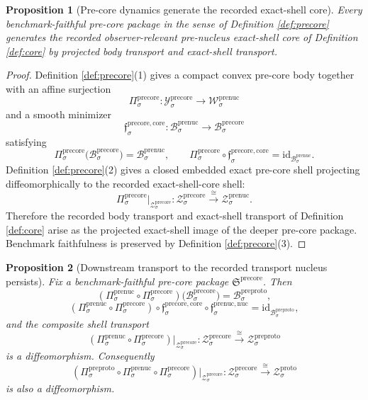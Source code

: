 \documentclass[11pt]{article}
\newcommand{\ProtoShellSet}[1]{\mathcal Z_{#1}^{\mathrm{proto}}}
\newcommand{\PreProtoBody}[1]{\mathcal B_{#1}^{\mathrm{preproto}}}
\newcommand{\PreProtoProj}[1]{\Pi_{#1}^{\mathrm{preproto}}}
\newcommand{\PreProtoShellSet}[1]{\mathcal Z_{#1}^{\mathrm{preproto}}}
\newcommand{\PreNucSpace}[1]{\mathcal W_{#1}^{\mathrm{prenuc}}}
\newcommand{\PreNucBody}[1]{\mathcal B_{#1}^{\mathrm{prenuc}}}
\newcommand{\PreNucProj}[1]{\Pi_{#1}^{\mathrm{prenuc}}}
\newcommand{\PreNucNucleusMin}[1]{\mathfrak f_{#1}^{\mathrm{prenuc,nuc}}}
\newcommand{\PreNucShellSet}[1]{\mathcal Z_{#1}^{\mathrm{prenuc}}}
\newcommand{\PreCorePackage}{\mathfrak S^{\mathrm{precore}}}
\newcommand{\PreCoreSpace}[1]{\mathcal Y_{#1}^{\mathrm{precore}}}
\newcommand{\PreCoreBody}[1]{\mathcal B_{#1}^{\mathrm{precore}}}
\newcommand{\PreCoreProj}[1]{\Pi_{#1}^{\mathrm{precore}}}
\newcommand{\PreCoreCoreMin}[1]{\mathfrak f_{#1}^{\mathrm{precore,core}}}
\newcommand{\PreCoreShellSet}[1]{\mathcal Z_{#1}^{\mathrm{precore}}}
\newtheorem{proposition}{Proposition}
\begin{document}
\begin{proposition}[Pre-core dynamics generate the recorded exact-shell core]
\label{prop:core}
Every benchmark-faithful pre-core package in the sense of Definition \ref{def:precore} generates the recorded observer-relevant pre-nucleus exact-shell core of Definition \ref{def:core} by projected body transport and exact-shell transport.
\end{proposition}

\begin{proof}
Definition \ref{def:precore}(1) gives a compact convex pre-core body together with an affine surjection
\[
\PreCoreProj{\sigma}:\PreCoreSpace{\sigma}\to\PreNucSpace{\sigma}
\]
and a smooth minimizer
\[
\PreCoreCoreMin{\sigma}:\PreNucBody{\sigma}\to\PreCoreBody{\sigma}
\]
satisfying
\[
\PreCoreProj{\sigma}\bigl(\PreCoreBody{\sigma}\bigr)=\PreNucBody{\sigma},
\qquad
\PreCoreProj{\sigma}\circ\PreCoreCoreMin{\sigma}
=
\mathrm{id}_{\PreNucBody{\sigma}}.
\]
Definition \ref{def:precore}(2) gives a closed embedded exact pre-core shell projecting diffeomorphically to the recorded exact-shell-core shell:
\[
\PreCoreProj{\sigma}\big|_{\PreCoreShellSet{\sigma}}
:
\PreCoreShellSet{\sigma}
\xrightarrow{\cong}
\PreNucShellSet{\sigma}.
\]
Therefore the recorded body transport and exact-shell transport of Definition \ref{def:core} arise as the projected exact-shell image of the deeper pre-core package. Benchmark faithfulness is preserved by Definition \ref{def:precore}(3).
\end{proof}

\begin{proposition}[Downstream transport to the recorded transport nucleus persists]
\label{prop:downstream}
Fix a benchmark-faithful pre-core package \(\PreCorePackage\). Then
\[
(\PreNucProj{\sigma}\circ\PreCoreProj{\sigma})\bigl(\PreCoreBody{\sigma}\bigr)
=
\PreProtoBody{\sigma},
\]
\[
(\PreNucProj{\sigma}\circ\PreCoreProj{\sigma})\circ
\PreCoreCoreMin{\sigma}\circ\PreNucNucleusMin{\sigma}
=
\mathrm{id}_{\PreProtoBody{\sigma}},
\]
and the composite shell transport
\[
(\PreNucProj{\sigma}\circ\PreCoreProj{\sigma})\big|_{\PreCoreShellSet{\sigma}}
:
\PreCoreShellSet{\sigma}
\xrightarrow{\cong}
\PreProtoShellSet{\sigma}
\]
is a diffeomorphism. Consequently
\[
(\PreProtoProj{\sigma}\circ\PreNucProj{\sigma}\circ\PreCoreProj{\sigma})\big|_{\PreCoreShellSet{\sigma}}
:
\PreCoreShellSet{\sigma}
\xrightarrow{\cong}
\ProtoShellSet{\sigma}
\]
is also a diffeomorphism.
\end{proposition}
\end{document}
